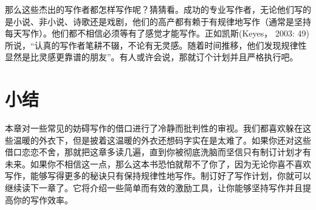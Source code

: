 那么这些杰出的写作者都怎样写作呢？猜猜看。成功的专业写作者，无论他们写的是小说、非小说、诗歌还是戏剧，他们的高产都有赖于有规律地写作（通常是坚持每天写作）。他们都不相信必须等有了感觉才能写作。正如凯斯(Keyes， 2003: 49) 所说，“认真的写作者笔耕不辍，不论有无灵感。随着时间推移，他们发现规律性显然是比灵感更靠谱的朋友”。有人或许会说，那就订个计划并且严格执行吧。

\section{小结}
本章对一些常见的妨碍写作的借口进行了冷静而批判性的审视。我们都喜欢躲在这些温暖的外衣下，但是披着这温暖的外衣还想码字实在是太难了。如果你还对这些借口恋恋不舍，那就把这章多读几遍，直到你被彻底洗脑而坚信只有制订计划才有未来。如果你不相信这一点，那么这本书恐怕就帮不了你了，因为无论你喜不喜欢写作，能够写得更多的秘诀只有保持规律性地写作。制订好了写作计划，你就可以继续读下一章了。它将介绍一些简单而有效的激励工具，让你能够坚持写作并且提高你的写作效率。